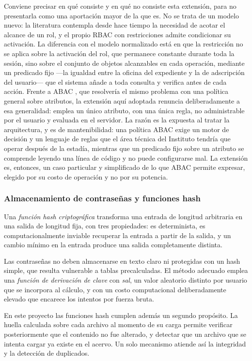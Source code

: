 Conviene precisar en qué consiste y en qué no consiste esta extensión, para no presentarla como una aportación mayor de la que es. No se trata de un modelo nuevo: la literatura contempla desde hace tiempo la necesidad de acotar el alcance de un rol, y el propio RBAC con restricciones \cite{ferraiolo2001nist} admite condicionar su activación. La diferencia con el modelo normalizado está en que la restricción no se aplica sobre la activación del rol, que permanece constante durante toda la sesión, sino sobre el conjunto de objetos alcanzables en cada operación, mediante un predicado fijo —la igualdad entre la oficina del expediente y la de adscripción del usuario— que el sistema añade a toda consulta y verifica antes de cada acción. Frente a ABAC \cite{hu2014abac}, que resolvería el mismo problema con una política general sobre atributos, la extensión aquí adoptada renuncia deliberadamente a esa generalidad: emplea un único atributo, con una única regla, no administrable por el usuario y evaluada en el servidor. La razón es la expuesta al tratar la arquitectura, y es de mantenibilidad: una política ABAC exige un motor de decisión y un lenguaje de reglas que el área técnica del Instituto tendría que operar después de la estadía, mientras que un predicado fijo sobre un atributo se comprende leyendo una línea de código y no puede configurarse mal. La extensión es, entonces, un caso particular y simplificado de lo que ABAC permite expresar, elegido por su costo de operación y no por su potencia.

\subsubsection{Almacenamiento de contraseñas y funciones hash}

Una \emph{función hash criptográfica} transforma una entrada de longitud arbitraria en una salida de longitud fija, con tres propiedades: es determinista, es computacionalmente inviable recuperar la entrada a partir de la salida, y un cambio mínimo en la entrada produce una salida completamente distinta.

Las contraseñas no deben almacenarse en texto claro ni protegidas con un hash simple, que resulta vulnerable a tablas precalculadas. El método adecuado emplea una \emph{función de derivación de clave} con \emph{sal}, un valor aleatorio distinto por usuario que se incorpora al cálculo, y con un costo computacional deliberadamente elevado que encarece los intentos por fuerza bruta.

En este proyecto las funciones hash cumplen además un segundo propósito. La huella calculada sobre cada archivo al momento de su carga permite verificar posteriormente que el contenido no fue alterado, y detectar que un archivo que se intenta cargar ya existe en el acervo. Un solo mecanismo atiende así la integridad y la detección de duplicados.


